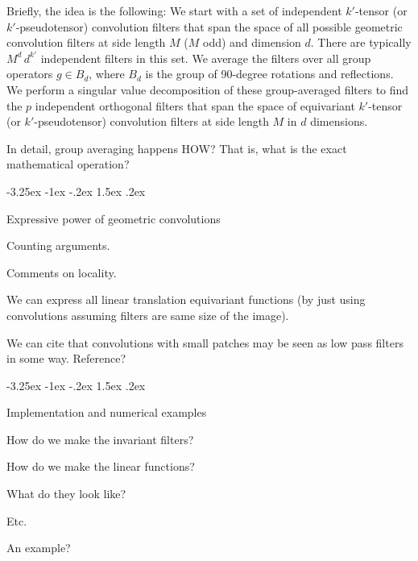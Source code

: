 \documentclass{article}
\makeatletter
\theoremstyle{plain}
\renewcommand\section{\@startsection {section}{1}{\z@}%
  {-3.25ex \@plus -1ex \@minus -.2ex}%
  {1.5ex \@plus .2ex}%
  {\raggedright\normalfont\large\bfseries}}
\makeatother
\begin{document}
Briefly, the idea is the following:
We start with a set of independent $k'$-tensor (or $k'$-pseudotensor) convolution filters that span the space of all possible geometric convolution filters at side length $M$ ($M$ odd) and dimension $d$.
There are typically $M^d\,d^{k'}$ independent filters in this set.
We average the filters over all group operators $g\in B_d$, where $B_d$ is the group of 90-degree rotations and reflections.
We perform a singular value decomposition of these group-averaged filters to find the $p$ independent orthogonal filters that span the space of equivariant $k'$-tensor (or $k'$-pseudotensor) convolution filters at side length $M$ in $d$ dimensions.

In detail, group averaging happens HOW? That is, what is the exact mathematical operation?

\section{Expressive power of geometric convolutions}\label{sec:universality}

Counting arguments.

Comments on locality.

We can express all linear translation equivariant functions (by just using convolutions assuming filters are same size of the image). 

We can cite that convolutions with small patches may be seen as low pass filters in some way. Reference?



\section{Implementation and numerical examples}\label{sec:examples}

How do we make the invariant filters?

How do we make the linear functions?

What do they look like?

Etc.

An example?
\end{document}
